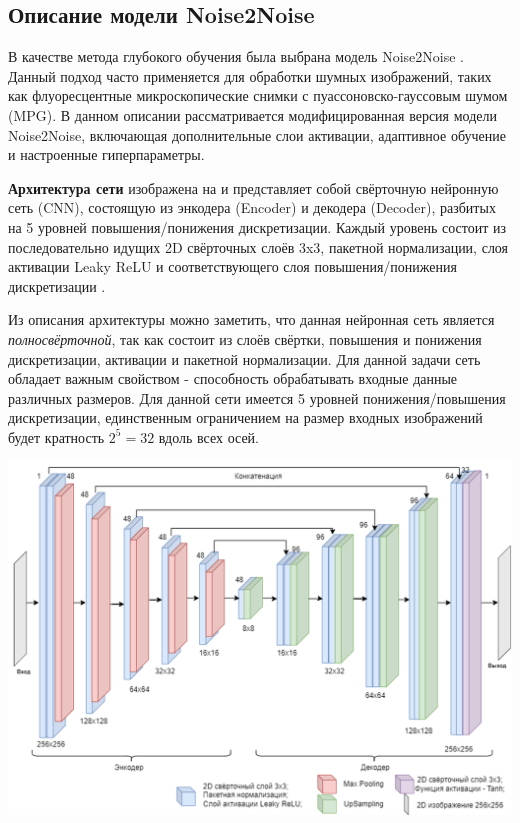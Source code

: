 \subsection{Описание модели Noise2Noise}
\par В качестве метода глубокого обучения была выбрана модель Noise2Noise \cite{noise2noise2018}. Данный подход часто применяется для обработки шумных изображений, таких как флуоресцентные микроскопические снимки с пуассоновско-гауссовым шумом (MPG). В данном описании рассматривается модифицированная версия модели Noise2Noise, включающая дополнительные слои активации, адаптивное обучение и настроенные гиперпараметры. 
\par \textbf{Архитектура сети} изображена на  и представляет собой свёрточную нейронную сеть (CNN), состоящую из энкодера (Encoder) и декодера (Decoder), разбитых на 5 уровней повышения/понижения дискретизации. Каждый уровень состоит из последовательно идущих 2D свёрточных слоёв 3x3, пакетной нормализации, слоя активации Leaky ReLU и соответствующего слоя повышения/понижения дискретизации \cite[с. 337-338]{denoising-imagej-22}. 
\par Из описания архитектуры можно заметить, что данная нейронная сеть является \textit{полносвёрточной}, так как состоит из слоёв свёртки, повышения и понижения дискретизации, активации и пакетной нормализации. Для данной задачи сеть обладает важным свойством - способность обрабатывать входные данные различных размеров. Для данной сети имеется 5 уровней понижения/повышения дискретизации, единственным ограничением на размер входных изображений будет кратность $2^5 = 32$ вдоль всех осей.
\begin{minipage}{\textwidth}
	\centering
	\vspace{\mfloatsep} %
	\includegraphics[keepaspectratio=true,scale=0.47] {my_folder/images/denoising/n2n_architecture.png}
	\label{fig:noise2noise}  
	\vspace{\mfloatsep} %
\end{minipage}
